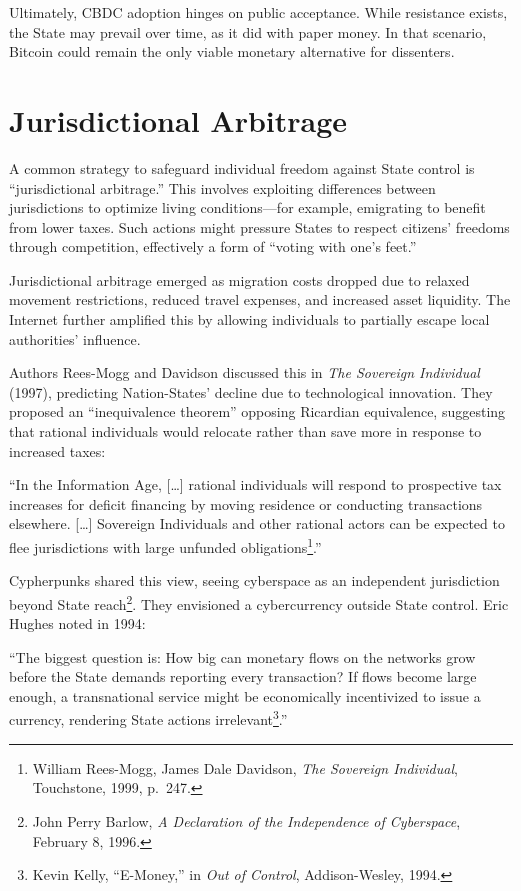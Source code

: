 \documentclass[
  a5paper,
  smalldemyvopaper,10pt,twoside,onecolumn,openright,extrafontsizes,hidelinks]{memoir}
\newlength\drop
\begin{document}
Ultimately, CBDC adoption hinges on public acceptance. While resistance
exists, the State may prevail over time, as it did with paper money. In
that scenario, Bitcoin could remain the only viable monetary alternative
for dissenters.

\section*{Jurisdictional Arbitrage}\label{larbitrage-juridictionnel}


A common strategy to safeguard individual freedom against State control
is ``jurisdictional arbitrage.'' This involves exploiting differences
between jurisdictions to optimize living conditions---for example,
emigrating to benefit from lower taxes. Such actions might pressure
States to respect citizens' freedoms through competition, effectively a
form of ``voting with one's feet.''

Jurisdictional arbitrage emerged as migration costs dropped due to
relaxed movement restrictions, reduced travel expenses, and increased
asset liquidity. The Internet further amplified this by allowing
individuals to partially escape local authorities' influence.

Authors Rees-Mogg and Davidson discussed this in \emph{The Sovereign
Individual} (1997), predicting Nation-States' decline due to
technological innovation. They proposed an ``inequivalence theorem''
opposing Ricardian equivalence, suggesting that rational individuals
would relocate rather than save more in response to increased taxes:

``In the Information Age, {[}\ldots{]} rational individuals will respond
to prospective tax increases for deficit financing by moving residence
or conducting transactions elsewhere. {[}\ldots{]} Sovereign Individuals
and other rational actors can be expected to flee jurisdictions with
large unfunded obligations\footnote{William Rees-Mogg, James Dale
  Davidson, \emph{The Sovereign Individual}, Touchstone, 1999, p.~247.}.''

Cypherpunks shared this view, seeing cyberspace as an independent
jurisdiction beyond State reach\footnote{John Perry Barlow, \emph{A
  Declaration of the Independence of Cyberspace}, February 8, 1996.}.
They envisioned a cybercurrency outside State control. Eric Hughes noted
in 1994:

``The biggest question is: How big can monetary flows on the networks
grow before the State demands reporting every transaction? If flows
become large enough, a transnational service might be economically
incentivized to issue a currency, rendering State actions
irrelevant\footnote{Kevin Kelly, ``E-Money,'' in \emph{Out of Control},
  Addison-Wesley, 1994.}.''
\end{document}
